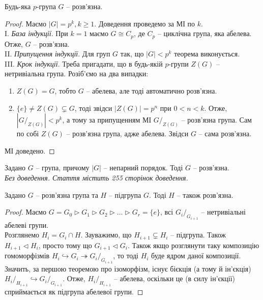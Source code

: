 \documentclass{math_library}
\begin{document}
\begin{theorem}
Будь-яка $p$-група $G$ -- розв'язна.
\end{theorem}

\begin{proof}
Маємо $|G| = p^k, k \geq 1$. Доведення проведемо за МІ по $k$.\\
I. \textit{База індукції}. При $k = 1$ маємо $G \cong C_p$, де $C_p$ -- циклічна група, яка абелева. Отже, $G$ -- розв'язна.\\
II. \textit{Припущення індукції}. Для груп $G$ так, що $|G| < p^k$ теорема виконується.\\
III. \textit{Крок індукції}. Треба пригадати, що в будь-якій $p$-групи $Z(G)$ -- нетривіальна група. Розіб'ємо на два випадки:
\begin{enumerate}[nosep,wide=0pt,label={\arabic*)}]
\item $Z(G) = G$, тобто $G$ -- абелева, але тоді автоматично розв'язна.
\item $\{e\} \neq Z(G) \subsetneq G$, тоді звідси $|Z(G)| = p^n$ при $0 < n < k$. Отже, $|G/_{Z(G)}| < p^k$, а тому за припущенням МІ $G/_{Z(G)}$ -- розв'язна група. Сам по собі $Z(G)$ -- розв'язна група, адже абелева. Звідси $G$ -- сама розв'язна.
\end{enumerate}
МІ доведено.
\end{proof}

\begin{theorem}
Задано $G$ -- група, причому $|G|$ -- непарний порядок. Тоді $G$ -- розв'язна.\\
\textit{Без доведення. Стаття містить 255 сторінок доведення.}
\end{theorem}

\begin{proposition}
Задано $G$ -- розв'язна група та $H$ -- підгрупа $G$. Тоді $H$ -- також розв'язна.
\end{proposition}

\begin{proof}
Маємо $G = G_0 \triangleright G_1 \triangleright G_2 \triangleright \dots \triangleright G_r = \{e\}$, всі ${G_i}/_{G_{i+1}}$ -- нетривіальні абелеві групи.\\
Розглянемо $H_i = G_i \cap H$. Зауважимо, що $H_{i+1} \subsetneq H_{i}$ -- підгрупа. Також $H_{i+1} \triangleleft H_i$, просто тому що $G_{i+1} \triangleleft G_i$. Також якщо розглянути таку композицію гомоморфізмів $H_i \hookrightarrow G_i \twoheadrightarrow {G_i}/_{G_{i+1}}$, то тоді $H_i$ буде ядром даної композиції. Значить, за першою теоремою про ізоморфізм, існує бієкція (а тому й ін'єкція) ${H_i}/_{H_{i+1}} \hookrightarrow {G_i}/_{G_{i+1}}$. Отже, ${H_i}/_{H_{i+1}}$ -- абелева, оскільки це (в силу ін'єкції) сприймається як підгрупа абелевої групи.
\end{proof}
\end{document}
